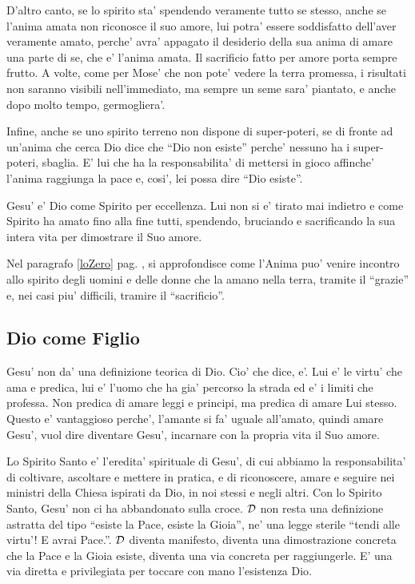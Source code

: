     D'altro canto, se lo spirito sta' spendendo veramente tutto se stesso, anche se l'anima amata non riconosce il suo amore, lui potra' essere soddisfatto dell'aver veramente amato, perche' avra' appagato il desiderio della sua anima di amare una parte di se, che e' l'anima amata. Il sacrificio fatto per amore porta sempre frutto. A volte, come per Mose' che non pote' vedere la terra promessa, i risultati non saranno visibili nell'immediato, ma sempre un seme sara' piantato, e anche dopo molto tempo, germogliera'.

    Infine, anche se uno spirito terreno non dispone di super-poteri, se di fronte ad un'anima che cerca Dio dice che ``Dio non esiste'' perche' nessuno ha i super-poteri, sbaglia. E' lui che ha la responsabilita' di mettersi in gioco affinche' l'anima raggiunga la pace e, cosi', lei possa dire ``Dio esiste''.

Gesu' e' Dio come Spirito per eccellenza. Lui non si e' tirato mai indietro e come Spirito ha amato fino alla fine tutti, spendendo, bruciando e sacrificando la sua intera vita per dimostrare il Suo amore.

 Nel paragrafo \ref{loZero} pag. \pageref{loZero}, si approfondisce come l'Anima puo' venire incontro allo spirito degli uomini e delle donne che la amano nella terra, tramite il ``grazie'' e, nei casi piu' difficili, tramire il ``sacrificio''. 


\subsection{Dio come Figlio}
Gesu' non da' una definizione teorica di Dio. Cio' che dice, e'. Lui e' le virtu' che ama e predica, lui e' l'uomo che ha gia' percorso la strada ed e' i limiti che professa. Non predica di amare leggi e principi, ma predica di amare Lui stesso. Questo e' vantaggioso perche', l'amante si fa' uguale all'amato, quindi amare Gesu', vuol dire diventare Gesu', incarnare con la propria vita il Suo amore.

Lo Spirito Santo e' l'eredita' spirituale di Gesu', di cui abbiamo la responsabilita' di coltivare, ascoltare e mettere in pratica, e di riconoscere, amare e seguire nei ministri della Chiesa ispirati da Dio, in noi stessi e negli altri. Con lo Spirito Santo, Gesu' non ci ha abbandonato sulla croce. $\mathcal{D}$ non resta una definizione astratta del tipo ``esiste la Pace, esiste la Gioia'', ne' una legge sterile ``tendi alle virtu'! E avrai Pace.''. $\mathcal{D}$ diventa manifesto, diventa una dimostrazione concreta che la Pace e la Gioia esiste, diventa una via concreta per raggiungerle. E' una via diretta e privilegiata per toccare con mano l'esistenza Dio.

